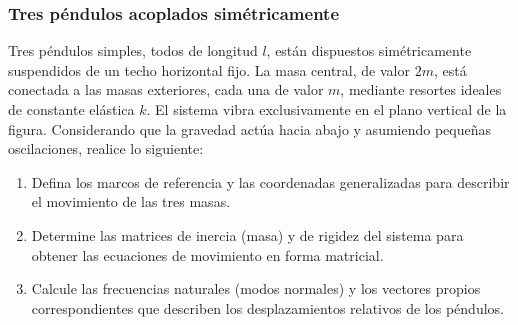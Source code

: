 \subsubsection{Tres péndulos acoplados simétricamente}

Tres péndulos simples, todos de longitud $l$, están dispuestos simétricamente suspendidos de un techo horizontal fijo. La masa central, de valor $2m$, está conectada a las masas exteriores, cada una de valor $m$, mediante resortes ideales de constante elástica $k$. El sistema vibra exclusivamente en el plano vertical de la figura. Considerando que la gravedad actúa hacia abajo y asumiendo pequeñas oscilaciones, realice lo siguiente:

\begin{enumerate}
    \item Defina los marcos de referencia y las coordenadas generalizadas para describir el movimiento de las tres masas.
    \item Determine las matrices de inercia (masa) y de rigidez del sistema para obtener las ecuaciones de movimiento en forma matricial.
    \item Calcule las frecuencias naturales (modos normales) y los vectores propios correspondientes que describen los desplazamientos relativos de los péndulos.
\end{enumerate}

